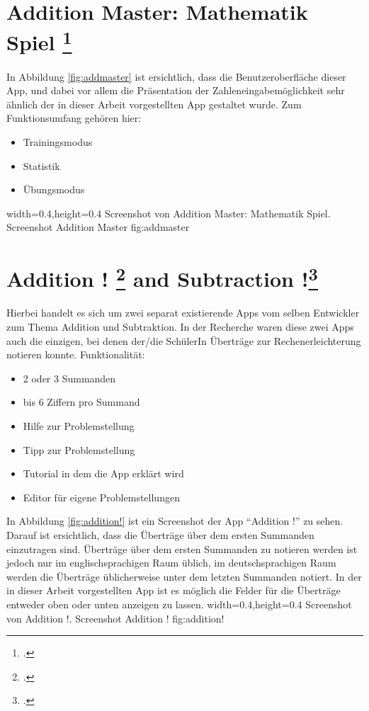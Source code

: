 \section{Addition Master: Mathematik Spiel \footcite{https://itunes.apple.com/de/app/addition-master-mathematik/id672669932?mt=8}}
In Abbildung \ref{fig:addmaster} ist ersichtlich, dass die Benutzeroberfläche dieser App, 
und dabei vor allem die Präsentation der Zahleneingabemöglichkeit sehr ähnlich der in dieser Arbeit 
vorgestellten App gestaltet wurde. Zum Funktionsumfang gehören hier: 
\begin{itemize}
	\item Trainingsmodus
	\item Statistik
	\item Übungsmodus
\end{itemize}

  {width=0.4\textwidth,height=0.4\textheight}%
  {Screenshot von Addition Master: Mathematik Spiel.}%
  {Screenshot Addition Master}%
  {fig:addmaster}%



\section{Addition ! \footcite{https://itunes.apple.com/de/app/addition-!/id447548669?mt=8} and Subtraction !\footcite{https://itunes.apple.com/de/app/subtraction-!/id447548515?mt=8}}
Hierbei handelt es sich um zwei separat existierende Apps vom selben Entwickler zum Thema
Addition und Subtraktion. In der Recherche waren diese zwei Apps auch die einzigen, bei denen
der/die SchülerIn Überträge zur Rechenerleichterung notieren konnte.
Funktionalität:
\begin{itemize}
	\item 2 oder 3 Summanden
	\item bis 6 Ziffern pro Summand
	\item Hilfe zur Problemstellung
	\item Tipp zur Problemstellung
	\item Tutorial in dem die App erklärt wird
	\item Editor für eigene Problemstellungen
\end{itemize}
In Abbildung \ref{fig:addition!} ist ein Screenshot der App \enquote{Addition !} zu sehen. Darauf ist ersichtlich, dass
die Überträge über dem ersten Summanden einzutragen sind. Überträge über dem ersten Summanden
zu notieren werden ist jedoch nur im englischsprachigen Raum üblich, im deutschsprachigen Raum werden 
die Überträge üblicherweise unter dem letzten Summanden notiert. In der in dieser Arbeit vorgestellten
App ist es möglich die Felder für die Überträge entweder oben oder unten anzeigen zu lassen.
  {width=0.4\textwidth,height=0.4\textheight}%
  {Screenshot von Addition !.}%
  {Screenshot Addition !}%
  {fig:addition!}%

